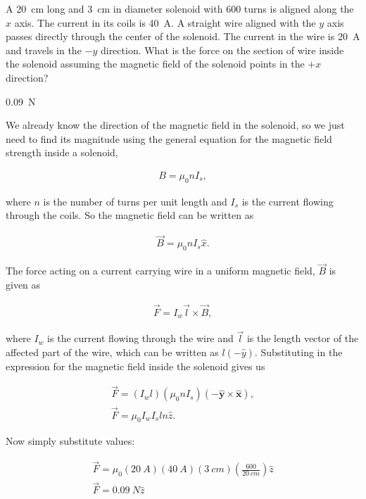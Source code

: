 \question A \SI{20}{\centi\metre} long and \SI{3}{\centi\metre} in diameter solenoid with 600 turns is aligned along the $x$ axis. The current in its coils is \SI{40}{\ampere}. A straight wire aligned with the $y$ axis passes directly through the center of the solenoid. The current in the wire is \SI{20}{\ampere} and travels in the $-y$ direction. What is the force on the section of wire inside the solenoid assuming the magnetic field of the solenoid points in the $+x$ direction?

\begin{finalanswer}
	\SI{0.09}{N}
\end{finalanswer}

\begin{solution}
We already know the direction of the magnetic field in the solenoid, so we just need to find its magnitude using the general equation for the magnetic field strength inside a solenoid,

\begin{align*}
B = \mu_0 n I_s,
\end{align*}

where $n$ is the number of turns per unit length and $I_s$ is the current flowing through the coils. So the magnetic field can be written as

\begin{align*}
\vec B = \mu_0 n I_s \hat{x}.
\end{align*}

The force acting on a current carrying wire in a uniform magnetic field, $\vec B$ is given as

\begin{align*}
\vec F= I_w \vec{l} \times \vec B,
\end{align*}

where $I_w$ is the current flowing through the wire  and $\vec{l}$ is the length vector of the affected part of the wire, which can be written as $l(-\hat y)$. Substituting in the expression for the magnetic field inside the solenoid gives us

\begin{align*}
\vec F = (I_w l)(\mu_0 n I_s)(-\hat{\mathbf{y}} \times \hat{\mathbf{x}}),\\
\vec F = \mu_0 I_w I_s l n \hat{z}.
\end{align*}

Now simply substitute values:

\begin{align*}
\vec F  = \mu_0 (\SI{20}{A}) (\SI{40}{A}) (\SI{3}{cm}) \left( \frac{600}{\SI{20}{cm}}\right) \hat{z}\\
\vec F  = \SI{0.09}{N}\hat{z}
\end{align*}

\end{solution}

